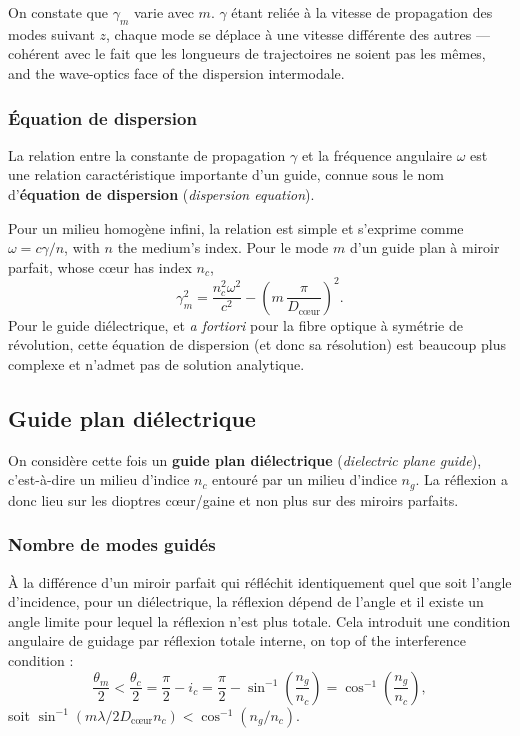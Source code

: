 On constate que $\gamma_m$ varie avec $m$. $\gamma$ étant reliée à la vitesse
de propagation des modes suivant $z$, chaque mode se déplace à une vitesse
différente des autres --- cohérent avec le fait que les longueurs de
trajectoires ne soient pas les mêmes, and the wave-optics face of the
dispersion intermodale.

\subsubsection{Équation de dispersion}
\begin{definition}
  La relation entre la constante de propagation $\gamma$ et la fréquence
  angulaire $\omega$ est une relation caractéristique importante d'un guide,
  connue sous le nom d'\textbf{équation de dispersion} (\textit{dispersion
  equation}).
\end{definition}
Pour un milieu homogène infini, la relation est simple et s'exprime comme
$\omega = c\gamma/n$, with $n$ the medium's index. Pour le mode $m$ d'un guide
plan à miroir parfait, whose cœur has index $n_c$,
\begin{equation*}
  \gamma_m^2 = \frac{n_c^2\omega^2}{c^2}
    - \left(m\,\frac{\pi}{D_{\text{cœur}}}\right)^2 .
\end{equation*}
Pour le guide diélectrique, et \emph{a fortiori} pour la fibre optique à
symétrie de révolution, cette équation de dispersion (et donc sa résolution)
est beaucoup plus complexe et n'admet pas de solution analytique.

\subsection{Guide plan diélectrique}

On considère cette fois un \textbf{guide plan diélectrique} (\textit{dielectric
plane guide}), c'est-à-dire un milieu d'indice $n_c$ entouré par un milieu
d'indice $n_g$. La réflexion a donc lieu sur les dioptres cœur/gaine et non plus
sur des miroirs parfaits.

\subsubsection{Nombre de modes guidés}
À la différence d'un miroir parfait qui réfléchit identiquement quel que soit
l'angle d'incidence, pour un diélectrique, la réflexion dépend de l'angle et il
existe un angle limite pour lequel la réflexion n'est plus totale. Cela
introduit une condition angulaire de guidage par réflexion totale interne, on
top of the interference condition :
\begin{equation*}
  \frac{\theta_m}{2} < \frac{\theta_c}{2}
  = \frac{\pi}{2} - i_c
  = \frac{\pi}{2} - \sin^{-1}\!\left(\frac{n_g}{n_c}\right)
  = \cos^{-1}\!\left(\frac{n_g}{n_c}\right),
\end{equation*}
soit $\sin^{-1}\!\left(m\lambda/2D_{\text{cœur}}n_c\right) <
\cos^{-1}(n_g/n_c)$.

